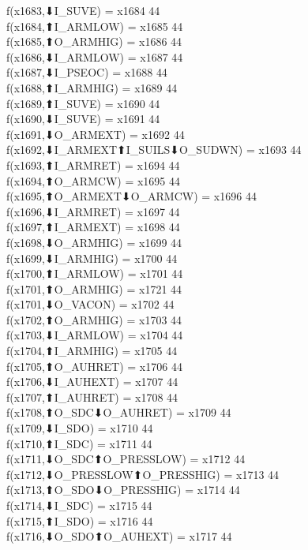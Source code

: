 f(x1683,⬇I_SUVE) = x1684 {44} \\
f(x1684,⬆I_ARMLOW) = x1685 {44} \\
f(x1685,⬆O_ARMHIG) = x1686 {44} \\
f(x1686,⬇I_ARMLOW) = x1687 {44} \\
f(x1687,⬇I_PSEOC) = x1688 {44} \\
f(x1688,⬆I_ARMHIG) = x1689 {44} \\
f(x1689,⬆I_SUVE) = x1690 {44} \\
f(x1690,⬇I_SUVE) = x1691 {44} \\
f(x1691,⬇O_ARMEXT) = x1692 {44} \\
f(x1692,⬇I_ARMEXT⬆I_SUILS⬇O_SUDWN) = x1693 {44} \\
f(x1693,⬆I_ARMRET) = x1694 {44} \\
f(x1694,⬆O_ARMCW) = x1695 {44} \\
f(x1695,⬆O_ARMEXT⬇O_ARMCW) = x1696 {44} \\
f(x1696,⬇I_ARMRET) = x1697 {44} \\
f(x1697,⬆I_ARMEXT) = x1698 {44} \\
f(x1698,⬇O_ARMHIG) = x1699 {44} \\
f(x1699,⬇I_ARMHIG) = x1700 {44} \\
f(x1700,⬆I_ARMLOW) = x1701 {44} \\
f(x1701,⬆O_ARMHIG) = x1721 {44} \\
f(x1701,⬇O_VACON) = x1702 {44} \\
f(x1702,⬆O_ARMHIG) = x1703 {44} \\
f(x1703,⬇I_ARMLOW) = x1704 {44} \\
f(x1704,⬆I_ARMHIG) = x1705 {44} \\
f(x1705,⬆O_AUHRET) = x1706 {44} \\
f(x1706,⬇I_AUHEXT) = x1707 {44} \\
f(x1707,⬆I_AUHRET) = x1708 {44} \\
f(x1708,⬆O_SDC⬇O_AUHRET) = x1709 {44} \\
f(x1709,⬇I_SDO) = x1710 {44} \\
f(x1710,⬆I_SDC) = x1711 {44} \\
f(x1711,⬇O_SDC⬆O_PRESSLOW) = x1712 {44} \\
f(x1712,⬇O_PRESSLOW⬆O_PRESSHIG) = x1713 {44} \\
f(x1713,⬆O_SDO⬇O_PRESSHIG) = x1714 {44} \\
f(x1714,⬇I_SDC) = x1715 {44} \\
f(x1715,⬆I_SDO) = x1716 {44} \\
f(x1716,⬇O_SDO⬆O_AUHEXT) = x1717 {44} \\
